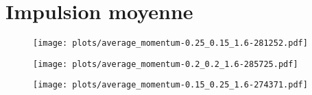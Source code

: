 \section{Impulsion moyenne}

%
%

\begin{figure}[H]
    \centering
    \texttt{[image: plots/average\_momentum-0.25\_0.15\_1.6-281252.pdf]}
\end{figure}

\begin{figure}[H]
    \centering
    \texttt{[image: plots/average\_momentum-0.2\_0.2\_1.6-285725.pdf]}
\end{figure}

\begin{figure}[H]
    \centering
    \texttt{[image: plots/average\_momentum-0.15\_0.25\_1.6-274371.pdf]}
\end{figure}














